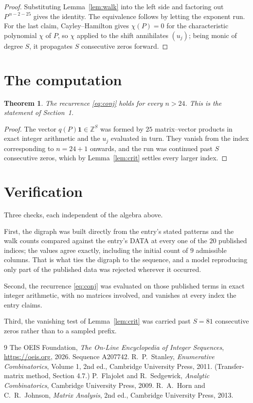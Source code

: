 \documentclass[11pt,a4paper]{article}
\theoremstyle{plain}
\newtheorem{theorem}{Theorem}
\theoremstyle{definition}
\begin{document}
\begin{proof}
Substituting Lemma~\ref{lem:walk} into the left side and factoring out
$P^{\,n-2-25}$ gives the identity. The equivalence follows by letting the exponent
run. For the last claim, Cayley--Hamilton gives $\chi(P)=0$ for the characteristic
polynomial $\chi$ of $P$, so $\chi$ applied to the shift annihilates $(u_j)$; being monic of
degree $S$, it propagates $S$ consecutive zeros forward.
\end{proof}

\section{The computation}

\begin{theorem}
The recurrence \eqref{eq:conj} holds for every $n>24$. This is the statement of
Section~1.
\end{theorem}

\begin{proof}
The vector $q(P)\mathbf{1}\in\mathbb{Z}^{S}$ was formed by $25$ matrix--vector
products in exact integer arithmetic and the $u_j$ evaluated in turn. They vanish from the
index corresponding to $n=24+1$ onwards, and the run was continued past $S$ consecutive
zeros, which by Lemma~\ref{lem:crit} settles every larger index.
\end{proof}

\section{Verification}

Three checks, each independent of the algebra above.

First, the digraph was built directly from the entry's stated patterns and the walk counts
compared against the entry's DATA at every one of the $20$ published indices; the
values agree exactly, including the initial count of $9$ admissible columns. That is
what ties the digraph to the sequence, and a model reproducing only part of the published
data was rejected wherever it occurred.

Second, the recurrence \eqref{eq:conj} was evaluated on those published terms in exact
integer arithmetic, with no matrices involved, and vanishes at every index the entry claims.

Third, the vanishing test of Lemma~\ref{lem:crit} was carried past $S=81$ consecutive
zeros rather than to a sampled prefix.

\begin{thebibliography}{9}
 The OEIS Foundation, \emph{The On-Line Encyclopedia of Integer
Sequences}, \url{https://oeis.org}, 2026. Sequence A207742.
 R.~P.~Stanley, \emph{Enumerative Combinatorics}, Volume 1, 2nd ed.,
Cambridge University Press, 2011. (Transfer-matrix method, Section 4.7.)
 P.~Flajolet and R.~Sedgewick, \emph{Analytic Combinatorics}, Cambridge
University Press, 2009.
 R.~A.~Horn and C.~R.~Johnson, \emph{Matrix Analysis}, 2nd ed., Cambridge
University Press, 2013.
\end{thebibliography}
\end{document}
